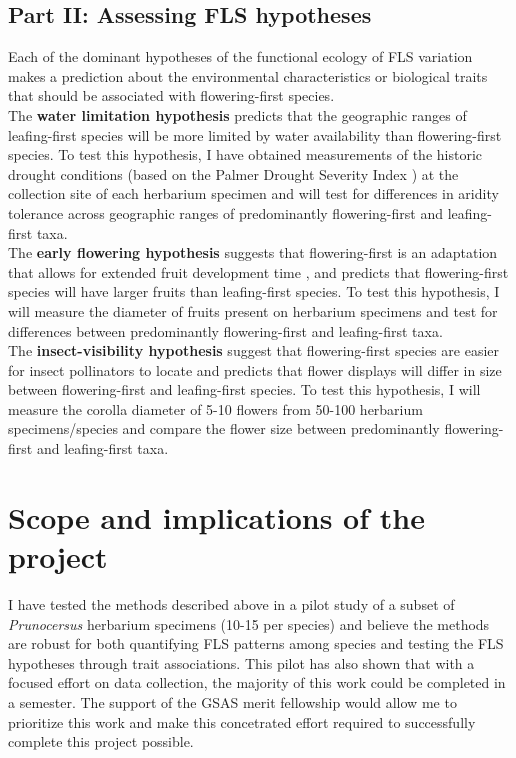 \documentclass[11pt]{article}
\begin{document}
\subsection*{Part II: Assessing FLS hypotheses}
Each of the dominant hypotheses of the functional ecology of FLS variation makes a prediction about the environmental characteristics or biological traits that should be associated with flowering-first species.\\

The \textbf{water limitation hypothesis} \citep{Gougherty2018} predicts that the geographic ranges of leafing-first species will be more limited by water availability than flowering-first species. To test this hypothesis, I have obtained measurements of the historic drought conditions (based on the Palmer Drought Severity Index \citep{Dai:2004aa}) at the collection site of each herbarium specimen and will test for differences in aridity tolerance across geographic ranges of predominantly flowering-first and leafing-first taxa.\\

The \textbf{early flowering hypothesis} suggests that flowering-first is an adaptation that allows for extended fruit development time \citep{Primack1987}, and predicts that flowering-first species will have larger fruits than leafing-first species. To test this hypothesis, I will measure the diameter of fruits present on herbarium specimens and test for differences between predominantly flowering-first and leafing-first taxa.\\

The \textbf{insect-visibility hypothesis} suggest that flowering-first species are easier for insect pollinators to locate \citep{Janzen1967} and predicts that flower displays will differ in size between flowering-first and leafing-first species. To test this hypothesis, I will measure the corolla diameter of 5-10 flowers from 50-100 herbarium specimens/species and compare the flower size between predominantly flowering-first and leafing-first taxa.

\section*{Scope and implications of the project}
I have tested the methods described above in a pilot study of a subset of \textit{Prunocersus} herbarium  specimens (10-15 per species) and believe the methods are robust for both quantifying FLS patterns among species and testing the FLS hypotheses through trait associations. This pilot has also shown that with a focused effort on data collection, the majority of this work could be completed in a semester. The support of the GSAS merit fellowship would allow me to prioritize this work and make this concetrated effort required to successfully complete this project possible.\\
\end{document}

